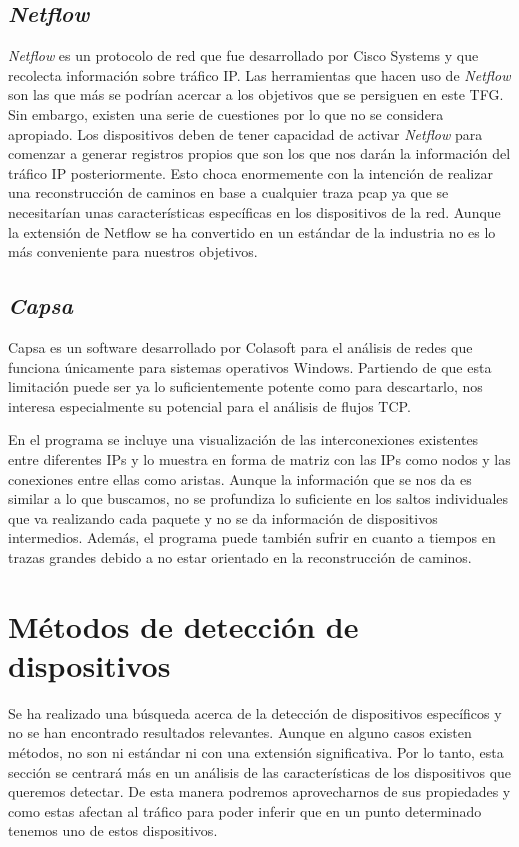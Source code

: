\documentclass[tfg,epsbased,lof,lot,loa,final,nocopyright,overleaf]{tfgtfmthesisuam}
\begin{document}
\subsection{\textit{Netflow}}
\textit{Netflow} \cite{NetFlow} es un protocolo de red que fue desarrollado por Cisco Systems y que recolecta información sobre tráfico IP. Las herramientas que hacen uso de \textit{Netflow} son las que más se podrían acercar a los objetivos que se persiguen en este TFG. Sin embargo, existen una serie de cuestiones por lo que no se considera apropiado. Los dispositivos deben de tener capacidad de activar \textit{Netflow} para comenzar a generar registros propios que son los que nos darán la información del tráfico IP posteriormente. Esto choca enormemente con la intención de realizar una reconstrucción de caminos en base a cualquier traza pcap ya que se necesitarían unas características específicas en los dispositivos de la red. Aunque la extensión de Netflow se ha convertido en un estándar de la industria no es lo más conveniente para nuestros objetivos.

\subsection{\textit{Capsa}} 
Capsa \cite{ColasoftCapsa} es un software desarrollado por Colasoft para el análisis de redes que funciona únicamente para sistemas operativos Windows. Partiendo de que esta limitación puede ser ya lo suficientemente potente como para descartarlo, nos interesa especialmente su potencial para el análisis de flujos TCP.

En el programa se incluye una visualización de las interconexiones existentes entre diferentes IPs y lo muestra en forma de matriz con las IPs como nodos y las conexiones entre ellas como aristas. Aunque la información que se nos da es similar a lo que buscamos, no se profundiza lo suficiente en los saltos individuales que va realizando cada paquete y no se da información de dispositivos intermedios. Además, el programa puede también sufrir en cuanto a tiempos en trazas grandes debido a no estar orientado en la reconstrucción de caminos.

\section{Métodos de detección de dispositivos}
Se ha realizado una búsqueda acerca de la detección de dispositivos específicos y no se han encontrado resultados relevantes. Aunque en alguno casos existen métodos, no son ni estándar ni con una extensión significativa. Por lo tanto, esta sección se centrará más en un análisis de las características de los dispositivos que queremos detectar. De esta manera podremos aprovecharnos de sus propiedades y como estas afectan al tráfico para poder inferir que en un punto determinado tenemos uno de estos dispositivos.
\end{document}

